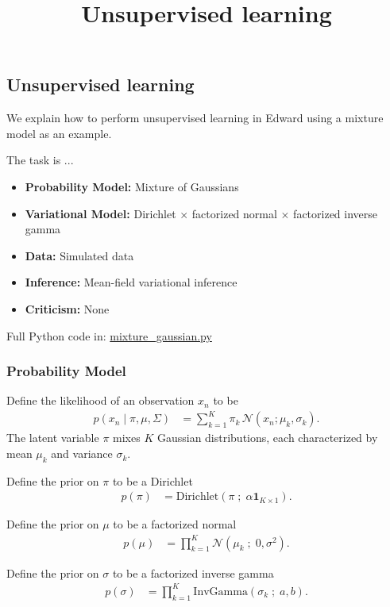 \title{Unsupervised learning}

\subsection{Unsupervised learning}

We explain how to perform unsupervised learning in Edward using
a mixture model as an example.

The task is ...

\begin{itemize}
  \item \textbf{Probability Model:} Mixture of Gaussians
  \item \textbf{Variational Model:} Dirichlet $\times$ factorized normal
  $\times$ factorized inverse gamma
  \item \textbf{Data:} Simulated data
  \item \textbf{Inference:} Mean-field variational inference
  \item \textbf{Criticism:} None
\end{itemize}

Full Python code in:
\href{https://github.com/blei-lab/edward/blob/master/examples/mixture_gaussian.py}
{mixture_gaussian.py}


\subsubsection{Probability Model}
Define the likelihood of an observation $x_n$
to be
\begin{align*}
  p(x_{n} \mid \pi, \mu, \Sigma)
  &=
  \sum_{k=1}^K \pi_k \, \mathcal{N}(x_n ; \mu_k, \sigma_k).
\end{align*}
The latent variable $\pi$ mixes $K$ Gaussian distributions, each
characterized by mean $\mu_k$ and variance $\sigma_k$.

Define the prior on $\pi$ to be a Dirichlet
\begin{align*}
  p(\pi)
  &=
  \text{Dirichlet}(\pi \;;\; \alpha \mathbf{1}_{K \times 1}).
\end{align*}

Define the prior on $\mu$ to be a factorized normal
\begin{align*}
  p(\mu)
  &=
  \prod_{k=1}^{K} \mathcal{N}(\mu_k \;;\; 0, \sigma^2).
\end{align*}

Define the prior on $\sigma$ to be a factorized inverse gamma
\begin{align*}
  p(\sigma)
  &=
  \prod_{k=1}^{K} \text{InvGamma}(\sigma_k \;;\; a, b).
\end{align*}

